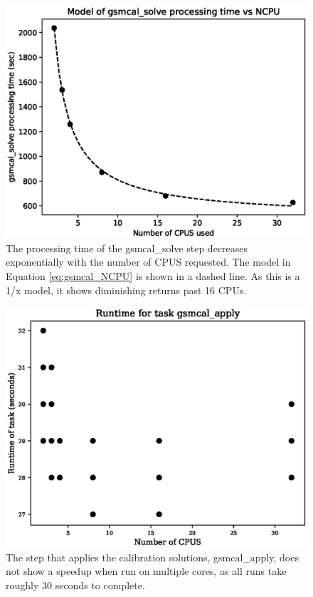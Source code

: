 \documentclass[preprint,5p]{elsarticle}
\begin{document}
\begin{figure}
    \includegraphics[width=0.95\linewidth]{figures/gsmcal_NCPU_and_model.eps}
      \caption{The processing time of the gsmcal\_solve step decreases exponentially with the number of CPUS requested. The model in Equation \ref{eq:gsmcal_NCPU} is shown in a dashed line. As this is a 1/x model, it shows diminishing returns past 16 CPUs. }
	\label{fig:gsmcal_solve_NCPU}
\end{figure}

\begin{figure}
    \includegraphics[width=0.95\linewidth]{figures/gsmcal_apply_NCPU.eps}
      \caption{The step that applies the calibration solutions, gsmcal\_apply, does not show a speedup when run on multiple cores, as all runs take roughly 30 seconds to complete.  }
	\label{fig:gsmcal_apply_NCPU}
\end{figure}
\end{document}
